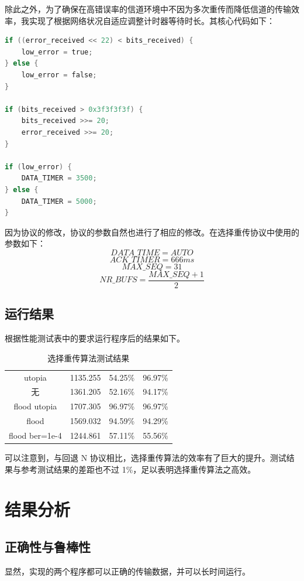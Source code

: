 \documentclass[14pt]{article} %
\begin{document}
除此之外，为了确保在高错误率的信道环境中不因为多次重传而降低信道的传输效率，我实现了根据网络状况自适应调整计时器等待时长。其核心代码如下：
\begin{lstlisting}[language=C]
if ((error_received << 22) < bits_received) {
	low_error = true;
} else {
	low_error = false;
}

if (bits_received > 0x3f3f3f3f) {
	bits_received >>= 20;
	error_received >>= 20;
}

if (low_error) {
	DATA_TIMER = 3500;
} else {
	DATA_TIMER = 5000;
}
\end{lstlisting}
因为协议的修改，协议的参数自然也进行了相应的修改。在选择重传协议中使用的参数如下：
$$DATA\_TIME = AUTO$$
$$ACK\_TIMER = 666ms$$
$$MAX\_SEQ = 31$$
$$NR\_BUFS = \frac {MAX\_SEQ + 1} {2}$$
\subsection{运行结果}
根据性能测试表中的要求运行程序后的结果如下。

\begin{table}[!htbp]
	\caption{选择重传算法测试结果}\label{sr} \centering
	\begin{tabular}{cccc}
		\toprule[1.5pt]
		\makebox[0.3\textwidth][c]{参数}	&  \makebox[0.1\textwidth][c]{运行时间} &
		\makebox[0.2\textwidth][c]{线路利用率(A)} & \makebox[0.2\textwidth][c]{线路利用率(B)} \\ \midrule[1pt]
		\textendash utopia & 1135.255 & 54.25\% & 96.97\% \\
		无 & 1361.205 & 52.16\% & 94.17\% \\
		\textendash flood \textendash utopia & 1707.305 & 96.97\% & 96.97\% \\
		\textendash flood & 1569.032 & 94.59\% & 94.29\% \\
		\textendash flood  \textendash ber=1e-4 & 1244.861 & 57.11\% & 55.56\% \\
		\bottomrule[1.5pt]
	\end{tabular}
\end{table}

可以注意到，与回退 N 协议相比，选择重传算法的效率有了巨大的提升。测试结果与参考测试结果的差距也不过 1\%，足以表明选择重传算法之高效。

\section{结果分析}
\subsection{正确性与鲁棒性}
显然，实现的两个程序都可以正确的传输数据，并可以长时间运行。
\end{document}
